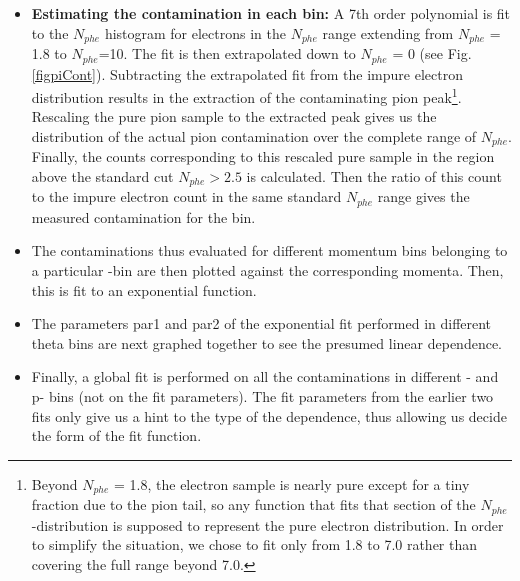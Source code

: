 \begin{itemize}
 
 \item {\bf Estimating the contamination in each bin:} %
 A 7th order polynomial is fit to the $N_{phe}$ histogram for electrons in the $N_{phe}$ range extending from $N_{phe}$ = 1.8 %
  to $N_{phe}$=10.  The fit is then extrapolated down to $N_{phe}$ = 0 (see Fig. \ref{figpiCont}). Subtracting the extrapolated fit from the impure electron distribution results in the extraction of the contaminating pion peak\footnote{Beyond $N_{phe}$ = 1.8, the electron sample is nearly pure except for a tiny fraction due to the pion tail, so any function that fits that section of the $N_{phe}$-distribution is supposed to represent the pure electron distribution. In order to simplify the situation, we chose to fit only from 1.8 to 7.0 %
  rather than covering the full range beyond 7.0.}. Rescaling the pure pion sample to the extracted peak gives us the distribution of the actual pion contamination over the complete range of $N_{phe}$. Finally, the counts corresponding to this rescaled pure sample in the region above the standard cut $N_{phe}>2.5$ is calculated. %
 Then the ratio of this count to the impure electron count in the same standard $N_{phe}$ range gives the measured contamination for the bin.
 \item The contaminations thus evaluated for different momentum bins belonging to a particular \thns-bin are then plotted against the corresponding momenta. Then, this is fit to an exponential function.
 \item The parameters par1 and par2 of the exponential fit performed in different theta bins are next graphed together to see the presumed linear dependence.
 \item Finally, a global fit is performed on all the contaminations in different \thns- and p- bins (not on the fit parameters). The fit parameters from the earlier two fits only give us a hint to the type of the dependence, thus allowing us decide the form of the fit function.
\end{itemize}

